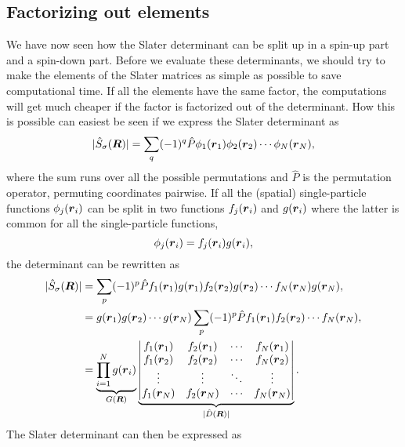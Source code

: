 \subsection{Factorizing out elements} \label{sec:factorizing}
We have now seen how the Slater determinant can be split up in a spin-up part and a spin-down part. Before we evaluate these determinants, we should try to make the elements of the Slater matrices as simple as possible to save computational time. If all the elements have the same factor, the computations will get much cheaper if the factor is factorized out of the determinant. How this is possible can easiest be seen if we express the Slater determinant as
\begin{equation}
|\hat{S}_{\sigma}(\boldsymbol{{R}})|=\sum_{q}(-1)^q\hat{P}\phi_1(\boldsymbol{{r}}_1)\phi_2(\boldsymbol{{r}}_2)\cdots\phi_N(\boldsymbol{{r}}_N),
\label{eq:slatersum}
\end{equation}
where the sum runs over all the possible permutations and $\hat{P}$ is the permutation operator, permuting coordinates pairwise. If all the (spatial) single-particle functions $\phi_j(\boldsymbol{{r}}_i)$ can be split in two functions $f_j(\boldsymbol{{r}}_i)$ and $g(\boldsymbol{{r}}_i)$ where the latter is common for all the single-particle functions,
\begin{equation}
\phi_j(\boldsymbol{{r}}_i)=f_j(\boldsymbol{{r}}_i)g(\boldsymbol{{r}}_i),
\end{equation}
the determinant can be rewritten as
\begin{equation}
\begin{aligned}
|\hat{S}_{\sigma}(\boldsymbol{{R}})|&=\sum_{p}(-1)^p\hat{P}f_1(\boldsymbol{{r}}_1)g(\boldsymbol{{r}}_1)f_2(\boldsymbol{{r}}_2)g(\boldsymbol{{r}}_2)\cdots f_N(\boldsymbol{{r}}_N)g(\boldsymbol{{r}}_N),\\
&=g(\boldsymbol{{r}}_1)g(\boldsymbol{{r}}_2)\cdots g(\boldsymbol{{r}}_N)\sum_{p}(-1)^p\hat{P}f_1(\boldsymbol{{r}}_1)f_2(\boldsymbol{{r}}_2)\cdots f_N(\boldsymbol{{r}}_N),\\
&=\underbrace{\prod_{i=1}^Ng(\boldsymbol{{r}}_i)}_{G(\boldsymbol{{R}})}
\underbrace{\begin{vmatrix}
f_1(\boldsymbol{r}_1) & f_2(\boldsymbol{r}_1) & \cdots & f_N(\boldsymbol{r}_1)\\
f_1(\boldsymbol{r}_2) & f_2(\boldsymbol{r}_2) & \cdots & f_N(\boldsymbol{r}_2)\\
\vdots & \vdots & \ddots & \vdots \\
f_1(\boldsymbol{r}_N) & f_2(\boldsymbol{r}_N) & \cdots & f_N(\boldsymbol{r}_N)
\end{vmatrix}}_{|\hat{D}(\boldsymbol{{R}})|}.
\end{aligned}
\end{equation}
The Slater determinant can then be expressed as
